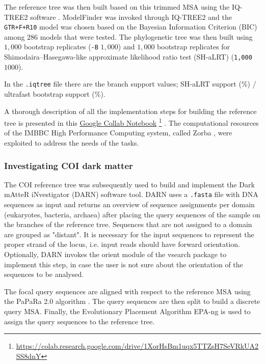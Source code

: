    The reference tree was then built based on this trimmed MSA using the IQ-TREE2 software \cite{hoang2018ufboot2, minh2020iq}.
   ModelFinder was invoked through IQ-TREE2 and the \texttt{GTR+F+R10} model was chosen based on the 
   Bayesian Information Criterion (BIC) among $286$ models that were tested. 
   The phylogenetic tree was then built using $1,000$ bootstrap replicates (\texttt{-B} $1,000$) and 
   $1,000$ bootstrap replicates for Shimodaira–Hasegawa-like approximate likelihood ratio test (SH-aLRT) (\texttt{1,000} $1000$).
   
   In the \texttt{.iqtree} file there are the branch support values; SH-aLRT support (\%) / ultrafast bootstrap support (\%).
   
   A thorough description of all the implementation steps for building the reference tree is presented in this 
   \href{https://colab.research.google.com/drive/1XorHsBm1uqx5TTZsH7SeVRkUA2SS8dnY}{Google Collab Notebook} 
   \footnote{
      \href{https://colab.research.google.com/drive/1XorHsBm1uqx5TTZsH7SeVRkUA2SS8dnY}{https://colab.research.google.com/drive/1XorHsBm1uqx5TTZsH7SeVRkUA2SS8dnY}
   }
   . 
   The computational resources of the IMBBC High Performance Computing system, called Zorba \cite{zafeiropoulos20210s}, were exploited to address the needs of the tasks.


   \subsubsection*{Investigating COI dark matter}
   \label{subsec:darn-methods-investigate}

   The COI reference tree was subsequently used to build and implement the Dark mAtteR iNvestigator (DARN) software tool. 
   DARN uses a \texttt{.fasta} file with DNA sequences as input and returns an overview of sequence assignments per domain (eukaryotes, bacteria, archaea) after placing the query sequences of the sample on the branches of the reference tree. 
   Sequences that are not assigned to a domain are grouped as "distant". 
   It is necessary for the input sequences to represent the proper strand of the locus, 
   i.e. input reads should have forward orientation. 
   Optionally, DARN invokes the orient module of the vsearch package \cite{rognes2016vsearch} to implement this step, in case the user is not sure about the orientation of the sequences to be analysed.

   The focal query sequences are aligned with respect to the reference MSA using the PaPaRa 2.0 algorithm \cite{berger2012papara}. 
   The query sequences are then split to build a discrete query MSA. 
   Finally, the Evolutionary Placement Algorithm EPA-ng \cite{barbera2019epa} is used to assign the query sequences to the reference tree.

